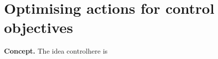 \chapter{\sffamily Optimising actions for control objectives}

{\bfseries\sffamily Concept.} The idea  controlhere is 